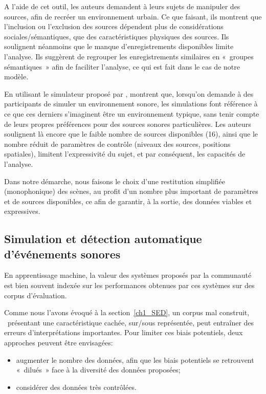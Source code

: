 A l'aide de cet outil, les auteurs demandent à leurs sujets de manipuler des sources, afin de recréer un environnement urbain. Ce que faisant, ils montrent que l'inclusion ou l'exclusion des sources dépendent plus de considérations sociales/sémantiques, que des caractéristiques physiques des sources. Ils soulignent néanmoins que le manque d'enregistrements disponibles limite l'analyse. Ils suggèrent de regrouper les enregistrements similaires en «~groupes sémantiques~» afin de faciliter l'analyse, ce qui est fait dans le cas de notre modèle. 

En utilisant le simulateur proposé par \citep{bruce2009development}, \citep{davies2014soundscape} montrent que, lorsqu'on demande à des participants de simuler un environnement sonore, les simulations font référence à ce que ces derniers s'imaginent être un environnement typique, sans tenir compte de leurs propres préférences pour des sources sonores particulières. Les auteurs soulignent là encore que le faible nombre de sources disponibles (16), ainsi que le nombre réduit de paramètres de contrôle (niveaux des sources, positions spatiales), limitent l'expressivité du sujet, et par conséquent, les capacités de l'analyse.

Dans notre démarche, nous faisons le choix d'une restitution simplifiée (monophonique) des scènes, au profit d'un nombre plus important de paramètres et de sources disponibles, ce afin de garantir, à la sortie, des données viables et expressives.

\subsection{Simulation et détection automatique d'événements sonores}
\label{sec:ch4_modAnaAuto}

En apprentissage machine, la valeur des systèmes proposés par la communauté est bien souvent indexée sur les performances obtenues par ces systèmes sur des corpus d'évaluation.

Comme nous l'avons évoqué à la section~\ref{ch1_SED}, un corpus mal construit, \ie~présentant une caractéristique cachée, sur/sous représentée, peut entraîner des erreurs d'interprétations importantes. Pour limiter ces biais potentiels, deux approches peuvent être envisagées:

\begin{itemize}
\item augmenter le nombre des données, afin que les biais potentiels se retrouvent «~dilués~» face à la diversité des données proposées;
\item considérer des données très contrôlées.
\end{itemize}

